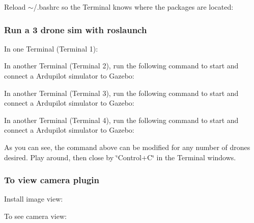Reload {\ttfamily $\sim$/.bashrc} so the Terminal knows where the packages are located\+: 
\begin{DoxyCode}{0}
\end{DoxyCode}


\subsubsection*{Run a 3 drone sim with roslaunch}

In one Terminal (Terminal 1)\+: 
\begin{DoxyCode}{0}
\end{DoxyCode}
 In another Terminal (Terminal 2), run the following command to start and connect a Ardupilot simulator to Gazebo\+: 
\begin{DoxyCode}{0}
\end{DoxyCode}
 In another Terminal (Terminal 3), run the following command to start and connect a Ardupilot simulator to Gazebo\+: 
\begin{DoxyCode}{0}
\end{DoxyCode}
 In another Terminal (Terminal 4), run the following command to start and connect a Ardupilot simulator to Gazebo\+: 
\begin{DoxyCode}{0}
\end{DoxyCode}
 As you can see, the command above can be modified for any number of drones desired. Play around, then close by \char`\"{}\+Control+\+C\char`\"{} in the Terminal windows.

\subsubsection*{To view camera plugin}

Install image view\+: 
\begin{DoxyCode}{0}
\end{DoxyCode}


To see camera view\+: 
\begin{DoxyCode}{0}
\end{DoxyCode}


